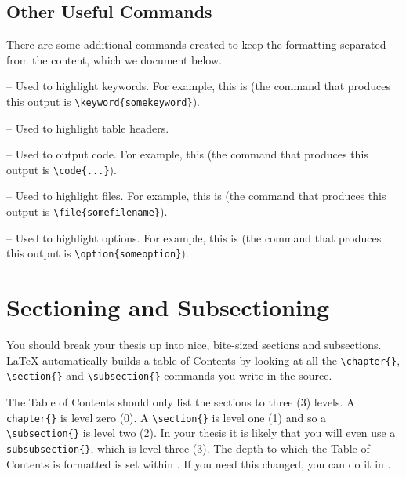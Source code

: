 \subsection{Other Useful Commands}

There are some additional commands created to keep the formatting separated from the content, which we document below.

 -- Used to highlight keywords. For example, this is  (the command that produces this output is \verb|\keyword{somekeyword}|).

 -- Used to highlight table headers. 

 -- Used to output code. For example, this  (the command that produces this output is \verb|\code{...}|).

 -- Used to highlight files. For example, this is  (the command that produces this output is \verb|\file{somefilename}|).

 -- Used to highlight options. For example, this is  (the command that produces this output is \verb|\option{someoption}|).


\section{Sectioning and Subsectioning}

You should break your thesis up into nice, bite-sized sections and subsections. \LaTeX{} automatically builds a table of Contents by looking at all the \verb|\chapter{}|, \verb|\section{}|  and \verb|\subsection{}| commands you write in the source.

The Table of Contents should only list the sections to three (3) levels. A \verb|chapter{}| is level zero (0). A \verb|\section{}| is level one (1) and so a \verb|\subsection{}| is level two (2). In your thesis it is likely that you will even use a \verb|subsubsection{}|, which is level three (3). The depth to which the Table of Contents is formatted is set within . If you need this changed, you can do it in .

